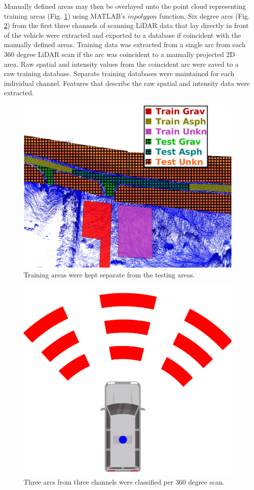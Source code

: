 \documentclass[numbered,pdftex]{ohio-etd}
\begin{document}
{{		{Manually defined areas may then be overlayed unto the point cloud representing training areas (Fig. \ref{fig:test_vs_train_areas}) using MATLAB's $inpolygon$ function. Six degree arcs (Fig. \ref{fig:area_example}) from the first three channels of scanning LiDAR data that lay directly in front of the vehicle were extracted and exported to a database if coincident with the manually defined areas. Training data was extracted from a single arc from each 360 degree LiDAR scan if the arc was coincident to a manually projected 2D area. Raw spatial and intensity values from the coincident arc were saved to a raw training database. Separate training databases were maintained for each individual channel. Features that describe the raw spatial and intensity data were extracted. }
		
		\begin{figure}[H]
			\centering
			\includegraphics[width=0.95\linewidth]{Defense_Images/test_vs_train_areas_hatch}
			\caption[Training vs Testing Areas]{Training areas were kept separate from the testing areas.}
			\label{fig:test_vs_train_areas}
		\end{figure}
		
		\begin{figure}[H]
		\centering
		\includegraphics[width=0.25\linewidth]{Defense_Images/area_example}
		\caption[Areas to Classify]{Three arcs from three channels were classified per 360 degree scan. }
		\label{fig:area_example}
		\end{figure}
	
}}
\end{document}

